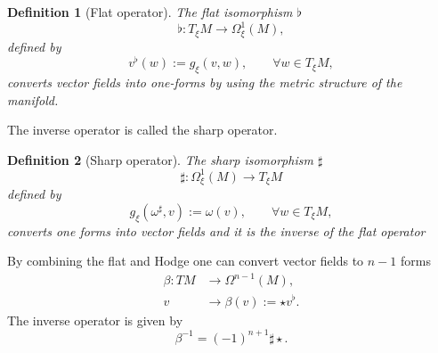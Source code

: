 \documentclass{elsarticle}
\newtheorem{definition}{Definition}
\begin{document}
\begin{definition}[Flat operator]
The flat isomorphism $\flat$ 
\begin{equation}
    \flat: T_\xi M \rightarrow \Omega^1_\xi(M),
\end{equation}
defined by
\begin{equation}
v^\flat(w):= g_\xi(v, w), \qquad \forall w \in T_\xi M,
\end{equation}
converts vector fields into one-forms by using the metric structure of the manifold.
\end{definition}
The inverse operator is called the sharp operator.
\begin{definition}[Sharp operator]
The sharp isomorphism $\sharp$
\begin{equation}
    \sharp: \Omega^1_\xi(M) \rightarrow T_\xi M
\end{equation}
defined by
\begin{equation}
    g_\xi(\omega^\sharp, v) := \omega(v), \qquad \forall w \in T_\xi M,
\end{equation}
converts one forms into vector fields and it is the inverse of the flat operator
\end{definition}
By combining the flat and Hodge one can convert vector fields to $n-1$ forms
\begin{equation}
\begin{aligned}
    \beta: T M &\rightarrow \Omega^{n-1}(M), \\
             v &\rightarrow  \beta(v):= \star v^\flat.
\end{aligned}
\end{equation}
The inverse operator is given by
\begin{equation}
    \beta^{-1}= (-1)^{n+1} \sharp \star.  
\end{equation}
\end{document}
